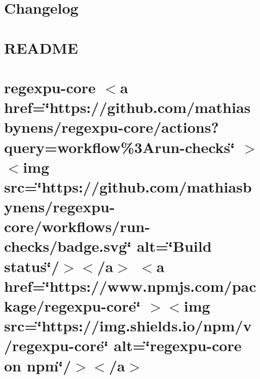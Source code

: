 \documentclass[twoside]{book}
\newcommand{\+}{\discretionary{\mbox{\scriptsize$\hookleftarrow$}}{}{}}
\begin{document}
\chapter{Changelog}
\label{md__c___users_vaishnavi_jadhav__desktop__developer_code_mean_stack_example_client_node_modules_r203e274b55ad11b3a4985bd1fb2aede5}

\chapter{README}
\label{md__c___users_vaishnavi_jadhav__desktop__developer_code_mean_stack_example_client_node_modules_rf6d3fd94efe44fb7a2f6cbcdd7d147f2}

\chapter{regexpu-\/core \texorpdfstring{$<$}{<}a href=\char`\"{}https\+://github.\+com/mathiasbynens/regexpu-\/core/actions?query=workflow\%3\+Arun-\/checks\char`\"{} \texorpdfstring{$>$}{>}\texorpdfstring{$<$}{<}img src=\char`\"{}https\+://github.\+com/mathiasbynens/regexpu-\/core/workflows/run-\/checks/badge.\+svg\char`\"{} alt=\char`\"{}\+Build status\char`\"{}/\texorpdfstring{$>$}{>}\texorpdfstring{$<$}{<}/a\texorpdfstring{$>$}{>} \texorpdfstring{$<$}{<}a href=\char`\"{}https\+://www.\+npmjs.\+com/package/regexpu-\/core\char`\"{} \texorpdfstring{$>$}{>}\texorpdfstring{$<$}{<}img src=\char`\"{}https\+://img.\+shields.\+io/npm/v/regexpu-\/core\char`\"{} alt=\char`\"{}regexpu-\/core on npm\char`\"{}/\texorpdfstring{$>$}{>}\texorpdfstring{$<$}{<}/a\texorpdfstring{$>$}{>}}
\label{md__c___users_vaishnavi_jadhav__desktop__developer_code_mean_stack_example_client_node_modules_regexpu_core__r_e_a_d_m_e}

\end{document}
